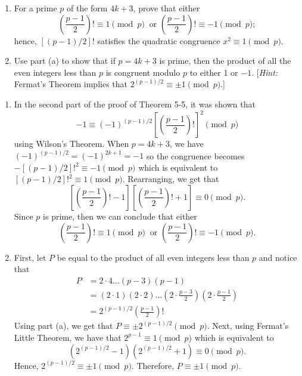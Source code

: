 \begin{exercise}
    \begin{enumerate}
        \item For a prime $p$ of the form $4k+3$, prove that either
        $$\left(\frac{p-1}{2}\right)! \equiv 1 \pmod p \ \text{ or } \left(\frac{p-1}{2}\right)! \equiv -1 \pmod p;$$
        hence, $[(p-1)/2]!$ satisfies the quadratic congruence $x^2 \equiv 1 \pmod p$.
        \item Use part (a) to show that if $p = 4k+3$ is prime, then the product of all the even integers less than $p$ is congruent modulo $p$ to either 1 or $-1$. [\textit{Hint:} Fermat's Theorem implies that $2^{(p-1)/2} \equiv \pm 1 \pmod p$.]
    \end{enumerate}
\end{exercise}

\begin{solution}
    \begin{enumerate}
        \item In the second part of the proof of Theorem 5-5, it was shown that 
        $$-1 \equiv (-1)^{(p-1)/2}\left[\left(\frac{p-1}{2}\right)!\right]^2 \pmod p$$
        using Wilson's Theorem. When $p = 4k+3$, we have $(-1)^{(p-1)/2} = (-1)^{2k+1} = -1$ so the congruence becomes $-[(p-1)/2]!^2 \equiv -1 \pmod{p}$ which is equivalent to $[(p-1)/2]!^2 \equiv 1 \pmod{p}$. Rearranging, we get that 
        $$\left[\left(\frac{p-1}{2}\right)! - 1\right]\left[\left(\frac{p-1}{2}\right)! + 1\right] \equiv 0 \pmod{p}.$$
        Since $p$ is prime, then we can conclude that either
        $$\left(\frac{p-1}{2}\right)! \equiv 1 \pmod p \ \text{ or } \left(\frac{p-1}{2}\right)! \equiv -1 \pmod p.$$
        \item First, let $P$ be equal to the product of all even integers less than $p$ and notice that
        \begin{align*}
            P &= 2\cdot 4 \dots (p-3)(p-1) \\
            &= (2\cdot 1)(2\cdot 2)\dots \left(2\cdot \frac{p-3}{2}\right)\left(2\cdot \frac{p-1}{2}\right) \\
            &= 2^{(p-1)/2}\left(\frac{p-1}{2}\right)!
        \end{align*}
        Using part (a), we get that $P \equiv \pm 2^{(p-1)/2} \pmod p$. Next, using Fermat's Little Theorem, we have that $2^{p-1} \equiv 1 \pmod p$ which is equivalent to
        $$(2^{(p-1)/2} - 1)(2^{(p-1)/2} + 1) \equiv 0 \pmod p.$$
        Hence, $2^{(p-1)/2} \equiv \pm 1 \pmod p$. Therefore, $P \equiv \pm 1 \pmod{p}$. \\
    \end{enumerate}
\end{solution}

